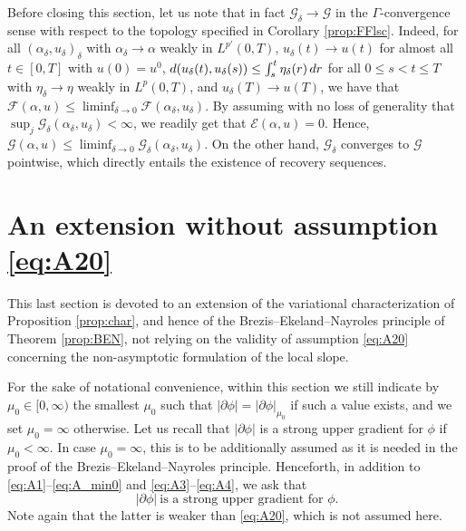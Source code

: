 \documentclass[10pt,a4paper]{amsart}
\renewcommand{\sl}{|\partial \phi|}
\newcommand{\GG}{{\mathcal G}}
\newcommand{\EE}{{\mathcal E}}
\newcommand{\FF}{{\mathcal F}}
\renewcommand{\d}{{\rm d}}
\begin{document}
 Before closing this section, let us note that in fact $\GG_\delta \to \GG$ in the $\Gamma$-convergence sense with respect to the topology specified in Corollary \ref{prop:FFlsc}. Indeed, for all $(\alpha_\delta,u_\delta)_\delta$ with $\alpha_\delta\to \alpha $ weakly in $L^{p'}(0,T)$, $u_\delta(t)\to u(t)$ for almost all $t \in [0,T]$ with $u(0)=u^0$, $d(u_\delta(t),u_\delta(s)) \leq \int_s^t \eta_\delta(r)\, \d r $ for all $0\leq s <t \leq T$
with $\eta_\delta \to \eta$ weakly in $L^p(0,T)$, and $u_\delta(T)\to u(T)$, we have that $\FF(\alpha,u)\leq \liminf_{\delta\to 0}\FF(\alpha_\delta,u_\delta)$. By assuming with no loss of generality that $\sup_j\GG_\delta(\alpha_\delta,u_\delta)<\infty$, we readily get that $\EE(\alpha,u)=0$. Hence, $\GG(\alpha,u)\leq\liminf_{\delta\to 0}\GG_\delta(\alpha_\delta,u_\delta)$. On the other hand, $\GG_\delta$ converges to $\GG$ pointwise, which directly entails the existence of recovery sequences. 




\section{An extension  
   without assumption  \eqref{eq:A20}}\label{sec:beyond}


This last section is devoted to an extension of the variational
characterization of Proposition \ref{prop:char}, and hence of the
Brezis--Ekeland--Nayroles principle of  Theorem \ref{prop:BEN},
not relying on the validity of  assumption \eqref{eq:A20} concerning the non-asymptotic formulation of the local slope.

For the sake of notational convenience, within this section we still
indicate by $\mu_0 \in [0,\infty)$ the smallest $\mu_0$ such that
$\sl=\sl_{\mu_0}$ if such a value exists, and we set $\mu_0=\infty$ 
otherwise. Let
us recall that $\sl$ is a strong upper gradient for $\phi$ if
$\mu_0<\infty$. In case $\mu_0 =\infty$, this is to be additionally
assumed as it is needed in the proof of the
Brezis--Ekeland--Nayroles principle. Henceforth, in addition to \eqref{eq:A1}--\eqref{eq:A_min0} and
\eqref{eq:A3}--\eqref{eq:A4}, we ask that  
\begin{equation}
  \label{eq:A200}
 \ \sl \ \text{is a strong upper gradient
    for $\phi$}.
\end{equation}
Note again that the latter is weaker than \eqref{eq:A20}, which is not
assumed here.
\end{document}
